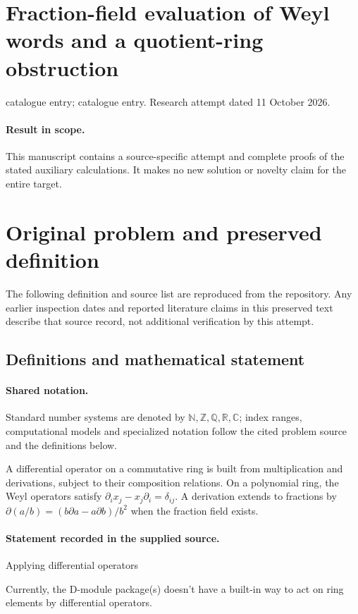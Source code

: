 \documentclass[11pt]{article}
\begin{document}
\section*{Fraction-field evaluation of Weyl words and a quotient-ring obstruction}
\noindent catalogue entry; catalogue entry. Research attempt dated 11 October 2026.
\paragraph{Result in scope.}This manuscript contains a source-specific attempt and complete proofs of the stated auxiliary calculations. It makes no new solution or novelty claim for the entire target.
\section{Original problem and preserved definition}
The following definition and source list are reproduced from the repository. Any earlier inspection dates and reported literature claims in this preserved text describe that source record, not additional verification by this attempt.
\subsection{Definitions and mathematical statement}

\paragraph{Shared notation.}Standard number systems are denoted by $\mathbb N,\mathbb Z,\mathbb Q,\mathbb R,\mathbb C$; index ranges, computational models and specialized notation follow the cited problem source and the definitions below.


A differential operator on a commutative ring is built from multiplication and derivations, subject to their composition relations. On a polynomial ring, the Weyl operators satisfy $\partial_i x_j-x_j\partial_i=\delta_{ij}$. A derivation extends to fractions by $\partial(a/b)=(b\partial a-a\partial b)/b^2$ when the fraction field exists.
\paragraph{Statement recorded in the supplied source.}
Applying differential operators

Currently, the D-module package(s) doesn't have a built-in way to act on ring elements by differential operators.
\end{document}
